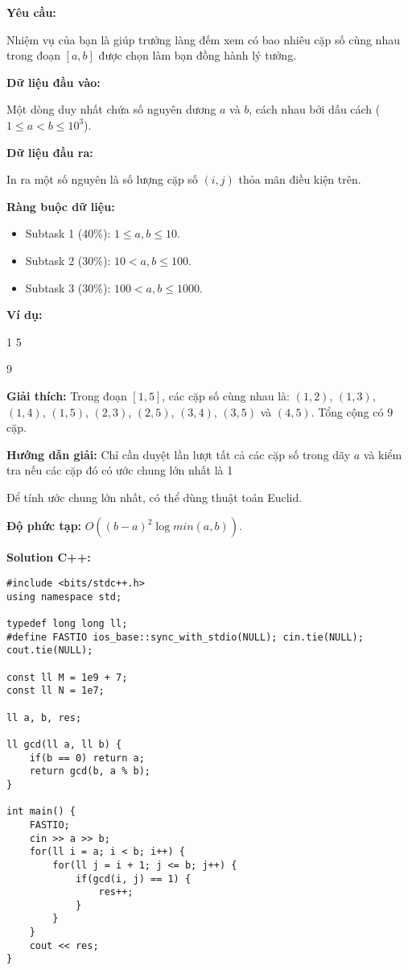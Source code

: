 \documentclass[12pt]{scrartcl}  %
\begin{document}
\textbf{Yêu cầu:}

Nhiệm vụ của bạn là giúp trưởng làng đếm xem có bao nhiêu cặp số cùng nhau trong đoạn $[a, b]$ được chọn làm bạn đồng hành lý tưởng.

\textbf{Dữ liệu đầu vào:}

Một dòng duy nhất chứa số nguyên dương $a$ và $b$, cách nhau bởi dấu cách ($1 \leq a < b \leq 10^3$).

\textbf{Dữ liệu đầu ra:}

In ra một số nguyên là số lượng cặp số $(i, j)$ thỏa mãn điều kiện trên.

\textbf{Ràng buộc dữ liệu:}

\begin{itemize}
    \item Subtask 1 (40\%): $1 \leq a, b \leq 10$.
    \item Subtask 2 (30\%): $10 < a, b \leq 100$.
    \item Subtask 3 (30\%): $100 < a, b \leq 1000$.
\end{itemize}

\textbf{Ví dụ:}
\begin{tcolorbox}[colback=gray!5!white, colframe=blue!50!black, title=Input]
1 5
\end{tcolorbox}
\begin{tcolorbox}[colback=gray!5!white, colframe=green!50!black, title=Output]
9
\end{tcolorbox}

\textbf{Giải thích:}
Trong đoạn $[1, 5]$, các cặp số cùng nhau là: $(1, 2)$, $(1, 3)$, $(1, 4)$, $(1, 5)$, $(2, 3)$, $(2, 5)$, $(3, 4)$, $(3, 5)$ và $(4, 5)$. Tổng cộng có $9$ cặp.

\textbf{Hướng dẫn giải:} Chỉ cần duyệt lần lượt tất cả các cặp số trong dãy $a$ và kiểm tra
nếu các cặp đó có ước chung lớn nhất là 1

Để tính ước chung lớn nhất, có thể dùng thuật toán Euclid.

\textbf{Độ phức tạp:} $O((b - a)^2 \log min(a, b))$.

\textbf{Solution C++:}
\begin{lstlisting}
#include <bits/stdc++.h>
using namespace std;

typedef long long ll;
#define FASTIO ios_base::sync_with_stdio(NULL); cin.tie(NULL); cout.tie(NULL);

const ll M = 1e9 + 7;
const ll N = 1e7;

ll a, b, res;

ll gcd(ll a, ll b) {
    if(b == 0) return a;
    return gcd(b, a % b);
}

int main() {
    FASTIO;
    cin >> a >> b;
    for(ll i = a; i < b; i++) {
        for(ll j = i + 1; j <= b; j++) {
            if(gcd(i, j) == 1) {
                res++;
            }
        }
    }
    cout << res;
}
\end{lstlisting}
\end{document}
